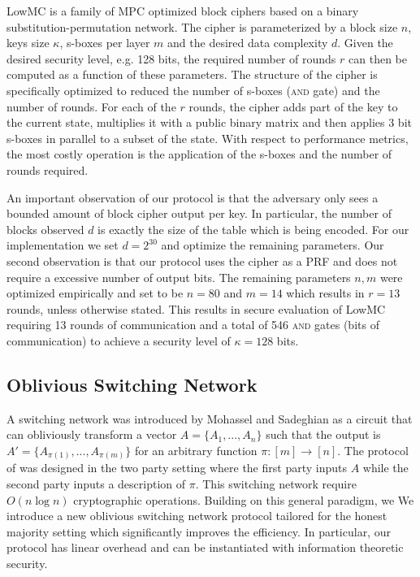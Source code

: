 LowMC is a family of MPC optimized block ciphers based on a binary substitution-permutation network. The cipher is parameterized by a block size $n$, keys size $\kappa$, s-boxes per layer $m$ and the desired data complexity $d$. 
\iffullversion
Given the desired security level, e.g. 128 bits, the required number of rounds $r$ can then be computed as a function of these parameters. The structure of the cipher is specifically optimized to reduced the number of s-boxes (\textsc{and} gate) and the number of rounds. For each of the $r$ rounds, the cipher adds part of the key to the current state, multiplies it with a public binary matrix and then applies 3 bit s-boxes in parallel to a subset of the state. 
\fi
With respect to performance metrics, the most costly operation is the application of the s-boxes and the number of rounds required. 

An important observation of our protocol is that the adversary only sees a bounded amount of block cipher output per key. In particular, the number of blocks observed $d$ is exactly the size of the table which is being encoded. For our implementation we set $d=2^{30}$ and optimize the remaining parameters. Our second observation is that our protocol uses the cipher as a PRF and does not require a excessive number of output bits. The remaining parameters $n,m$ were optimized empirically and set to be $n=80$ and $m=14$ which results in $r=13$ rounds, unless otherwise stated. This results in secure evaluation of LowMC requiring 13 rounds of communication and a total of 546 \textsc{and} gates (bits of communication) to achieve a security level of $\kappa=128$ bits\cite{lowmc}.


\subsection{Oblivious Switching Network}

A switching network was introduced by Mohassel and Sadeghian\cite{MS13} as a circuit that can obliviously transform a vector $A=\{A_1,...,A_n\}$ such that the output is $A'=\{A_{\pi(1)}, ..., A_{\pi(m)}\}$ for an arbitrary function $\pi : [m]\rightarrow[n]$. The protocol of \cite{MS13} was designed in the two party setting where the first party inputs $A$ while the second party inputs a description of $\pi$. \iffullversion
This switching network require  $O(n\log n)$ cryptographic operations. Building on this general paradigm, we 
\else 
We
\fi
introduce a new oblivious switching network protocol tailored for the honest majority setting which significantly improves the efficiency. In particular, our protocol has linear overhead and can be instantiated with information theoretic security. 


